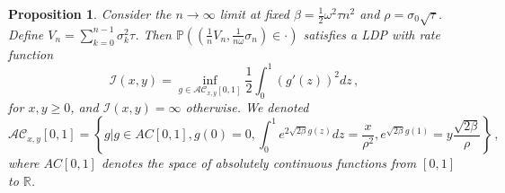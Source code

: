 \documentclass[11pt]{article}
\numberwithin{equation}{section}
\theoremstyle{plain}
\newtheorem{proposition}[theorem]{Proposition}
\begin{document}
\begin{proposition}\label{prop:I}
Consider the $n\to \infty$ limit at fixed $\beta = \frac12 \omega^2 \tau n^2$
and $\rho = \sigma_0 \sqrt{\tau}$.
Define $V_n=\sum_{k=0}^{n-1} \sigma_k^2 \tau$. Then
$\mathbb{P}((\frac{1}{n} V_n, \frac{1}{n\omega} \sigma_{n}) \in \cdot )$
satisfies a LDP with rate function
\begin{equation}\label{I2rf}
\mathcal{I}(x,y) = \inf_{g\in \mathcal{AC}_{x,y}[0,1]}
\frac12 \int_0^1 \left( g'(z) \right)^2 dz\,,
\end{equation}
for $x,y \geq 0$, and $\mathcal{I}(x,y)=\infty$ otherwise.
We denoted
\begin{equation}
\mathcal{AC}_{x,y}[0,1] = \left\{ g \bigg| g\in AC[0,1], g(0)=0,
\int_0^1 e^{2\sqrt{2\beta} g(z)} dz=\frac{x}{\rho^2},
e^{\sqrt{2\beta} g(1)}=y \frac{\sqrt{2\beta}}{\rho} \right\}\,,
\end{equation}
where $AC[0,1]$ denotes the space of absolutely continuous functions from $[0,1]$ to $\mathbb{R}$.
\end{proposition}
\end{document}

